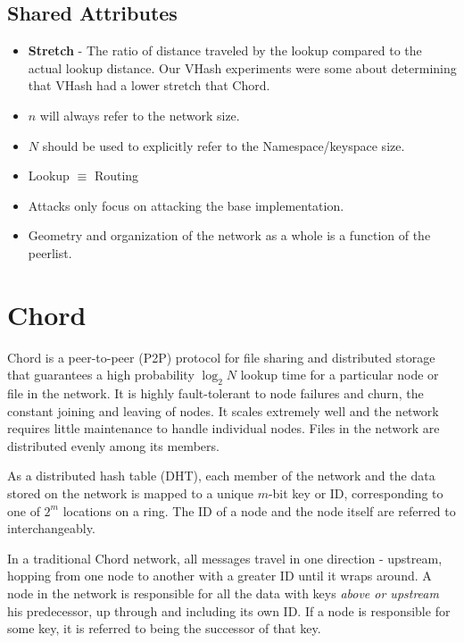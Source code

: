 \documentclass[10pt,letterpaper]{report}
\begin{document}
\subsection*{Shared Attributes}

\begin{itemize}
	\item \textbf{Stretch} \cite{hildrum2004distributed} - The ratio of distance traveled by the lookup compared to the actual lookup distance. Our VHash experiments were some about determining that VHash had a lower stretch that Chord.
	\item $n$ will always refer to the network size.
	\item $N$ should be used to explicitly refer to the Namespace/keyspace size.
	\item Lookup $\equiv $ Routing
	\item Attacks only focus on attacking the base implementation. 
	\item Geometry and organization of the network as a whole is a function of the peerlist.
	

\end{itemize}











\section{Chord}
Chord \cite{chord} is a peer-to-peer (P2P) protocol for file sharing and distributed storage that guarantees a high probability $\log_{2} N$ lookup time for a particular node or file in the network. 
It is highly fault-tolerant to node failures and churn, the constant joining and leaving of nodes.  It scales extremely well and the network requires little maintenance to handle individual nodes.  
Files in the network are distributed evenly among its members.

As a distributed hash table (DHT), each member of the network and the data stored on the network is mapped to a unique $m$-bit key or ID, corresponding to one of  $2^m$ locations on a ring. 
The ID of a node and the node itself are referred to interchangeably.

In a traditional Chord network, all messages travel in one direction - upstream, hopping from one node to another with a greater ID until it wraps around.
A node in the network is responsible for all the data with keys \textit{above or upstream} his predecessor, up through and including its own ID.  If a node is responsible for some key, it is referred to being the successor of that key.
\end{document}
